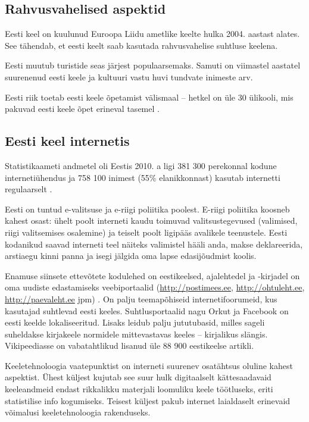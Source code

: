 \begin{multicols}{2}
\subsection{Rahvusvahelised aspektid}

Eesti keel on kuulunud Euroopa Liidu ametlike keelte hulka 2004. aastast alates.  See tähendab, et eesti keelt saab kasutada rahvusvahelise suhtluse keelena.

Eesti muutub turistide seas järjest populaarsemaks.  Samuti on viimastel aastatel suurenenud eesti keele ja kultuuri vastu huvi tundvate inimeste arv.

Eesti riik toetab eesti keele õpetamist välismaal -- hetkel on üle 30 ülikooli, mis pakuvad eesti keele õpet erineval tasemel \cite{EstInst}.

\subsection{Eesti keel internetis}

Statistikaameti andmetel oli Eestis 2010. a ligi 381 300 perekonnal kodune internetiühendus ja 758 100 inimest (55\% elanikkonnast) kasutab internetti regulaarselt \cite{Stat3}.

Eesti on tuntud e-valitsuse ja e-riigi polii\-tika poolest.  E-riigi poliitika koosneb kahest osast: ühelt poolt interneti kaudu toimuvad valitsustegevused (valimised, rii\-gi valitsemises osalemine) ja teiselt poolt ligipääs avalikele teenustele.  Eesti kodanikud saavad interneti teel näiteks valimistel hääli anda, makse deklareerida, arstiaegu kinni panna ja isegi jälgida oma lapse edasijõudmist koolis.


Enamuse siinsete ettevõtete kodulehed on eestikeelsed, ajalehtedel ja -kirjadel on oma uudiste edastamiseks veebi\-portaalid (\url{http://postimees.ee}, \url{http://ohtuleht.ee}, \url{http://paevaleht.ee} jpm) \cite{Neti}.  On palju teemapõhiseid internetifoorumeid, kus kasutajad suhtlevad eesti keeles.  Suhtlusportaalid nagu Orkut ja Facebook on eesti keelde lokaliseeritud.  Lisaks leidub palju jututubasid, milles sageli suheldakse kirjakeele normidele mittevastavas keeles -- kirjalikus slängis.  Vikipeediasse on vabatahtlikud lisanud üle 88 900 eestikeelse artikli.

Keeletehnoloogia vaatepunktist on interneti suurenev osatähtsus oluline kahest aspektist.  Ühest küljest kujutab see suur hulk digitaalselt kättesaadavaid keeleandmeid endast rikkalikku materjali loomuliku keele töötluseks, eriti statistilise info kogumiseks.  Teisest küljest pakub internet laialdaselt erinevaid võimalusi keeletehnoloogia rakenduseks.


\end{multicols}
